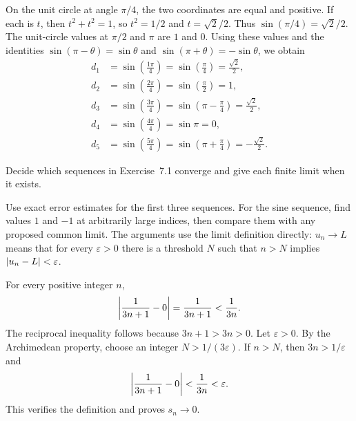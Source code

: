 On the unit circle at angle $\pi/4$, the two coordinates are equal
and positive. If each is $t$, then $t^2+t^2=1$, so
$t^2=1/2$ and $t=\sqrt2/2$. Thus $\sin(\pi/4)=\sqrt2/2$.
The unit-circle values at $\pi/2$ and $\pi$ are $1$ and $0$.
Using these values and the identities
$\sin(\pi-\theta)=\sin\theta$ and
$\sin(\pi+\theta)=-\sin\theta$, we obtain
\begin{align*}
 d_1&=\sin\left(\frac{1\pi}{4}\right)
      =\sin\left(\frac\pi4\right)=\frac{\sqrt2}{2},\\
 d_2&=\sin\left(\frac{2\pi}{4}\right)
      =\sin\left(\frac\pi2\right)=1,\\
 d_3&=\sin\left(\frac{3\pi}{4}\right)
      =\sin\left(\pi-\frac\pi4\right)=\frac{\sqrt2}{2},\\
 d_4&=\sin\left(\frac{4\pi}{4}\right)=\sin\pi=0,\\
 d_5&=\sin\left(\frac{5\pi}{4}\right)
      =\sin\left(\pi+\frac\pi4\right)=-\frac{\sqrt2}{2}.
\end{align*}


\goal Decide which sequences in Exercise~7.1 converge and give
each finite limit when it exists.

\idea Use exact error estimates for the first three sequences.
For the sine sequence, find values $1$ and $-1$ at arbitrarily large
indices, then compare them with any proposed common limit.
The arguments use the limit definition directly: $u_n\to L$ means
that for every $\varepsilon>0$ there is a threshold $N$ such that
$n>N$ implies $\left|u_n-L\right|<\varepsilon$.

For every positive integer $n$,
\[
 \left|\frac1{3n+1}-0\right|
 =\frac1{3n+1}<\frac1{3n}.
\]
The reciprocal inequality follows because $3n+1>3n>0$.
Let $\varepsilon>0$. By the Archimedean property, choose an integer
$N>1/(3\varepsilon)$. If $n>N$, then $3n>1/\varepsilon$ and
\[
 \left|\frac1{3n+1}-0\right|<\frac1{3n}<\varepsilon.
\]
This verifies the definition and proves $s_n\to0$.

